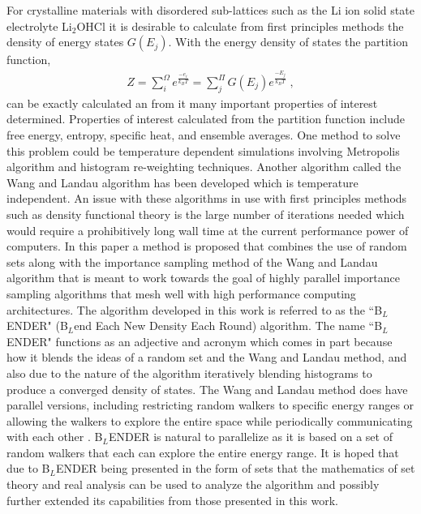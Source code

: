 \documentclass[aps,prl,reprint,superscriptaddress,showkeys]{revtex4-1}
\begin{document}
For crystalline materials  with disordered sub-lattices such as the Li ion solid state electrolyte  Li$_2$OHCl it is desirable to calculate from first principles methods the density of energy states $G(E_j)$. With the energy density of states the partition function,
\begin{equation}
\begin{split}
Z = \sum_{i}^{\Omega}e^{\frac{-e_i}{k_B T} }= \sum_{j}^{\Pi}G(E_j)e^{\frac{-E_j}{k_BT}} \;,
\end{split}
\end{equation}
 can be exactly calculated an from it many important properties of interest determined. Properties of interest calculated from the partition function include  free energy, entropy, specific heat, and ensemble averages. One method to solve this problem could be temperature dependent simulations involving  Metropolis algorithm and histogram re-weighting techniques\cite{landau_MC_simulations}.  Another algorithm called the  Wang and Landau algorithm\cite{WL_phys_rev_lett} has been developed which is temperature independent. An issue with these algorithms in use with first principles methods such as density functional theory is the large number of iterations needed which would require a prohibitively long wall time at the current performance power of computers.  In this paper a method is proposed that combines the use of random sets along with the importance sampling method of the Wang and Landau algorithm that is meant to work towards the goal of highly parallel importance sampling algorithms that mesh well with high performance computing architectures. The algorithm developed in this work is referred to as the ``B$_{L}$ENDER" (B$_{L}$end Each New Density Each Round) algorithm. The name ``B$_{L}$ENDER" functions as an  adjective and acronym  which comes in part because how it blends the ideas of a random set and the Wang and Landau method, and also due to the nature of the algorithm iteratively blending histograms to produce a converged density of states.  The Wang and Landau method does have parallel versions, including  restricting random walkers to specific energy ranges or allowing the walkers to explore the entire space while periodically communicating with each other \cite{MP_Wang_Landau,P_imp_Wang_Landau, Hframe_Wang_Landau}.  B$_{L}$ENDER is natural to parallelize as it is based on a set of random walkers that each can explore the entire energy range. It is hoped that due to B$_{L}$ENDER being presented in the form of sets that the mathematics of set theory and real analysis can be used to analyze the algorithm and possibly further extended its capabilities from those presented in this work. 
\end{document}
